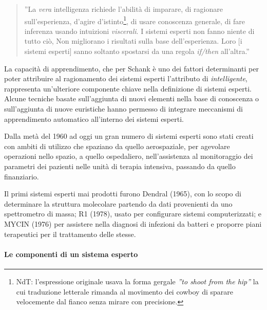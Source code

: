 \begin{quotation}
''La \emph{vera} intelligenza richiede l'abilità di imparare, di ragionare sull'esperienza, d'agire d'istinto\footnote{NdT: l'espressione originale usava la forma gergale \emph{''to shoot from the hip''} la cui traduzione letterale rimanda al movimento dei cowboy di sparare velocemente dal fianco senza mirare con precisione.}, di usare conoscenza generale, di fare inferenza usando intuizioni \emph{viscerali}. I sistemi esperti non fanno niente di tutto ciò, Non migliorano i risultati sulla base dell'esperienza. Loro [i sistemi esperti] sanno soltanto spostarsi da una regola \emph{if/then} all'altra.'' \cite{schank1984ia} 
\end{quotation}

La capacità di apprendimento, che per Schank \cite{schank1984ia} è uno dei fattori determinanti per poter attribuire al ragionamento dei sistemi esperti l'attributo di \emph{intelligente}, rappresenta un'ulteriore componente chiave nella definizione di sistemi esperti. Alcune tecniche basate sull'aggiunta di nuovi elementi nella base di conoscenza o sull'aggiunta di nuove euristiche hanno permesso di integrare meccanismi di apprendimento automatico all'interno dei sistemi esperti. \cite{nasa1988flops}

Dalla metà del 1960 ad oggi un gran numero di sistemi esperti sono stati creati con ambiti di utilizzo che spaziano da quello aerospaziale, per agevolare operazioni nello spazio, a quello ospedaliero, nell'assistenza al monitoraggio dei parametri dei pazienti nelle unità di terapia intensiva, passando da quello finanziario. \cite{jackson1999}

Il primi sistemi esperti mai prodotti furono Dendral (1965), con lo scopo di determinare la struttura molecolare partendo da dati provenienti da uno spettrometro di massa; R1 (1978), usato per configurare sistemi computerizzati; e MYCIN (1976) per assistere nella diagnosi di infezioni da batteri e proporre piani terapeutici per il trattamento delle stesse.

\paragraph{Le componenti di un sistema esperto} 


